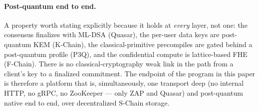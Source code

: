\paragraph{Post-quantum end to end.} A property worth stating explicitly because
it holds at \emph{every} layer, not one: the consensus finalizes with ML-DSA
(Quasar), the per-user data keys are post-quantum KEM (K-Chain), the
classical-primitive precompiles are gated behind a post-quantum profile (P3Q),
and the confidential compute is lattice-based FHE (F-Chain). There is no
classical-cryptography weak link in the path from a client's key to a finalized
commitment. The endpoint of the program in this paper is therefore a platform
that is, simultaneously, one transport deep (no internal HTTP, no gRPC, no
ZooKeeper --- only ZAP and Quasar) and post-quantum native end to end, over
decentralized S-Chain storage.
